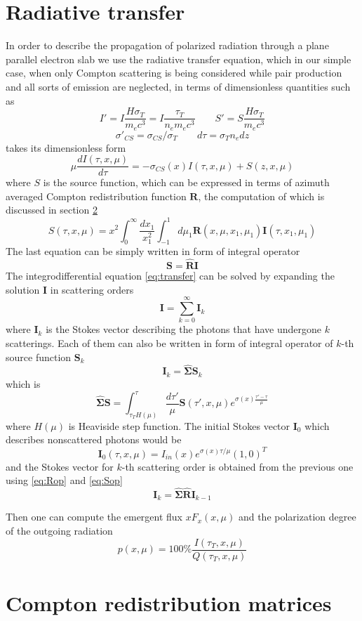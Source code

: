 \documentclass[iop, usenatbib]{emulateapj}
\newcommand{\be}{\begin{equation}}
\newcommand{\ee}{\end{equation}}
\begin{document}
\section{Radiative transfer}
In order to describe the propagation of polarized radiation through a plane parallel electron slab we use the radiative transfer equation, which in our  simple case, when only Compton scattering is being considered while pair production and all sorts of emission are neglected, in terms of dimensionless quantities such as $$
 I'=I \frac{H \sigma_T}{m_e c^3}=I \frac{\tau_T}{n_e m_e c^3} \qquad S'=S \frac{H \sigma_T}{m_e c^3}$$$$
\sigma'_{CS}=\sigma_{CS}/\sigma_T \qquad d\tau= \sigma_T n_e dz $$
takes its dimensionless form 
\be
\label{eq:transfer}
\mu \frac{d I (\tau,x,\mu)}{d\tau} = -  \sigma_{CS}(x)I(\tau,x,\mu) + S(z,x,\mu) 
\ee
where $S$ is the source function, which can be expressed in terms of azimuth averaged Compton redistribution function $\bm{R}$, the 
computation of which is discussed in section \ref{redistr} 
\be
\label{eq:Source}
S(\tau,x,\mu)= x^2 \int_0^\infty \frac{dx_1}{x_1^2} \int_{-1}^1 d\mu_1 
\bm{R}(x,\mu,x_1,\mu_1)\bm{I}(\tau,x_1,\mu_1)
\ee
The last equation can be simply written in form of integral operator
\be
\label{eq:Rop}
\bm{S}=\hat{\bm{R}}\bm{I}
\ee
 The integrodifferential equation \eqref{eq:transfer} can be solved by expanding the solution $\bm{I}$ in scattering orders
 \be
 \bm{I}=\sum_{k=0}^\infty \bm{I}_k
\ee
 where $\bm{I}_k$ is the Stokes vector describing the photons  that have undergone $k$ scatterings. Each of them can also be written in form of integral operator  of $k$-th source function $\bm{S}_k$
\be
\label{eq:Sop}
 \bm{I}_k=\hat{\bm{\Sigma}}\bm{S}_k
\ee
which is
 \be
 \hat{\bm{\Sigma}}\bm{S}=\int_{\tau_TH(\mu)}^\tau \frac{d\tau'}\mu \bm{S}(\tau',x,\mu) e^{\sigma(x)\frac{\tau'-\tau}\mu}
\ee 
where $H(\mu)$ is Heaviside step function. The initial Stokes vector $\bm{I}_0$ which describes nonscattered photons would be
\be
\bm{I}_0(\tau,x,\mu)=I_{in}(x) e^{\sigma(x)\tau/\mu} (1, 0)^T
\ee 
and the Stokes vector for $k$-th scattering order is obtained from the previous one using \eqref{eq:Rop} and \eqref{eq:Sop}
\be
\bm{I}_k=\hat{\bm{\Sigma}}\hat{\bm{R}}\bm{I}_{k-1}
\ee

Then one can compute the emergent flux $xF_x(x,\mu)$
and the polarization degree of the outgoing radiation
\be
p(x,\mu)=100\%\frac{I(\tau_T,x,\mu)}{Q(\tau_T,x,\mu)}
\ee



\section{Compton redistribution matrices} \label{redistr}
\end{document}
